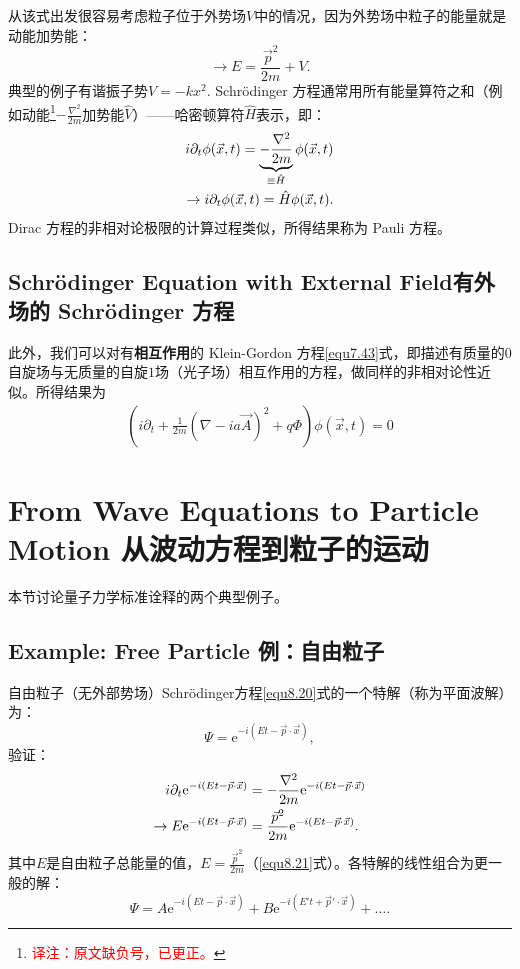 从该式出发很容易考虑粒子位于外势场$V$中的情况，因为外势场中粒子的能量就是动能加势能：
\[
	\to E = \frac{\vec{p}^2}{2m} + V.
\]
典型的例子有谐振子势$V = -k x^2$.  Schr\"{o}dinger 方程通常用所有能量算符之和（例如动能\footnote{\textcolor{red}{译注：原文缺负号，已更正。}}$-\frac{\nabla^2}{2m}$加势能$\hat{V}$）——哈密顿算符$\hat{H}$表示，即：
\begin{align}
	i \partial_t \phi(\vec{x}, t) = \underbrace{-\frac{\nabla^2}{2m} }_{\equiv \hat{H}} \phi(\vec{x}, t) \notag \\
\label{equ8.22}
	\to i \partial_t \phi(\vec{x}, t) = \hat{H} \phi(\vec{x}, t).
\end{align}
Dirac 方程的非相对论极限的计算过程类似，所得结果称为 Pauli 方程。



\subsection[有外场的 Schr\"{o}dinger 方程]{Schr\"{o}dinger Equation with External Field\quad 有外场的 Schr\"{o}dinger 方程}\label{sec8.4.1}

此外，我们可以对有{\bfseries 相互作用}的 Klein-Gordon 方程\eqref{equ7.43}式，即描述有质量的$0$自旋场与无质量的自旋$1$场（光子场）相互作用的方程，做同样的非相对论性近似。所得结果为
\begin{align}
\label{equ8.23}
	\left(i\partial_t+\frac{1}{2m}\left(\nabla-ia\vec{A}\right)^2+q\Phi\right)\phi(\vec{x},t)=0
\end{align}

\section[从波动方程到粒子的运动]{From Wave Equations to Particle Motion \quad 从波动方程到粒子的运动}\label{sec8.5}
本节讨论量子力学标准诠释的两个典型例子。

\subsection[例：自由粒子]{Example: Free Particle \quad 例：自由粒子}\label{sec8.5.1}
自由粒子（无外部势场）Schr\"{o}dinger方程\eqref{equ8.20}式的一个特解（称为平面波解）为：
\begin{equation}
\label{equ8.24}
	\Psi = \mathrm{e}^{-i (Et - \vec{p} \cdot \vec{x})},
\end{equation}
验证：
\begin{align}
	i \partial_t \mathrm{e}^{-i (Et - \vec{p} \cdot \vec{x}) } &= -\frac{\nabla^2}{2m} \mathrm{e}^{-i (Et - \vec{p} \cdot \vec{x}) } \notag \\
\label{equ8.25}
	\to E \mathrm{e}^{-i(Et - \vec{p} \cdot \vec{x}) } &= \frac{\vec{p}^2}{2m} \mathrm{e}^{-i(Et - \vec{p} \cdot \vec{x}) }.
\end{align}
其中$E$是自由粒子总能量的值，$E = \frac{\vec{p}^2}{2m}$（\eqref{equ8.21}式）。各特解的线性组合为更一般的解：
\[ \Psi = A \mathrm{e}^{-i(Et - \vec{p} \cdot \vec{x}) } + B \mathrm{e}^{-i (E' t + \vec{p}' \cdot \vec{x}) } + \dots . \]

